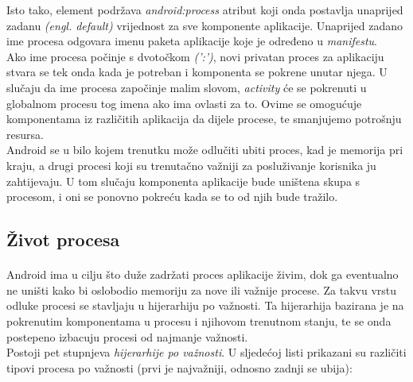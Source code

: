 \documentclass[times, utf8, zavrsni]{fer}
\begin{document}
Isto tako, \verb|| element podržava \textit{android:process} atribut koji onda postavlja unaprijed zadanu \textit{(engl. default)} vrijednost za sve komponente aplikacije. Unaprijed zadano ime procesa odgovara imenu paketa aplikacije koje je određeno u \textit{manifestu}.\\

Ako ime procesa počinje s dvotočkom \textit{(':')}, novi privatan proces za aplikaciju stvara se tek onda kada je potreban i komponenta se pokrene unutar njega. U slučaju da ime procesa započinje malim slovom, \textit{activity} će se pokrenuti u globalnom procesu tog imena ako ima ovlasti za to. Ovime se omogućuje komponentama iz različitih aplikacija da dijele procese, te smanjujemo potrošnju resursa.\\

Android se u bilo kojem trenutku može odlučiti ubiti proces, kad je memorija pri kraju, a drugi procesi koji su trenutačno važniji za posluživanje korisnika ju zahtijevaju. U tom slučaju komponenta aplikacije bude uništena skupa s procesom, i oni se ponovno pokreću kada se to od njih bude tražilo.


\subsection{Život procesa}
\paragraph{}
Android ima u cilju što duže zadržati proces aplikacije živim, dok ga eventualno ne uništi kako bi oslobodio memoriju za nove ili važnije procese. Za takvu vrstu odluke procesi se stavljaju u hijerarhiju po važnosti. Ta hijerarhija bazirana je na pokrenutim komponentama u procesu i njihovom trenutnom stanju, te se onda postepeno izbacuju procesi od najmanje važnosti.\\

Postoji pet stupnjeva \textit{hijerarhije po važnosti}. U sljedećoj listi prikazani su različiti tipovi procesa po važnosti (prvi je najvažniji, odnosno zadnji se ubija):
\end{document}

